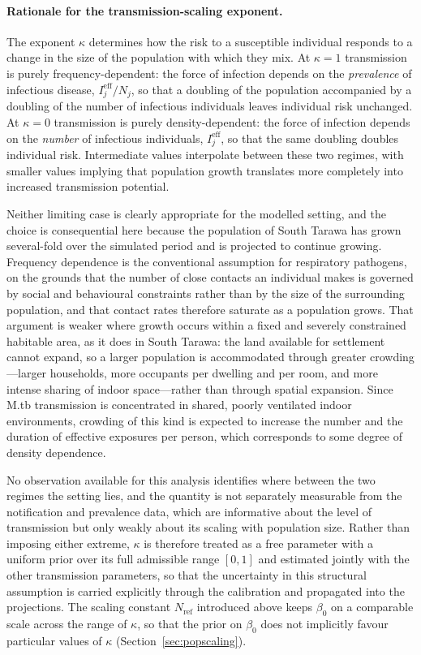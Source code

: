\documentclass[11pt]{article}
\begin{document}
\paragraph{Rationale for the transmission-scaling exponent.}
The exponent \(\kappa\) determines how the risk to a susceptible individual responds to a change in the size of the population with which they mix. At \(\kappa=1\) transmission is purely frequency-dependent: the force of infection depends on the \emph{prevalence} of infectious disease, \(I^{\mathrm{eff}}_j/N_j\), so that a doubling of the population accompanied by a doubling of the number of infectious individuals leaves individual risk unchanged. At \(\kappa=0\) transmission is purely density-dependent: the force of infection depends on the \emph{number} of infectious individuals, \(I^{\mathrm{eff}}_j\), so that the same doubling doubles individual risk. Intermediate values interpolate between these two regimes, with smaller values implying that population growth translates more completely into increased transmission potential.

Neither limiting case is clearly appropriate for the modelled setting, and the choice is consequential here because the population of South Tarawa has grown several-fold over the simulated period and is projected to continue growing. Frequency dependence is the conventional assumption for respiratory pathogens, on the grounds that the number of close contacts an individual makes is governed by social and behavioural constraints rather than by the size of the surrounding population, and that contact rates therefore saturate as a population grows. That argument is weaker where growth occurs within a fixed and severely constrained habitable area, as it does in South Tarawa: the land available for settlement cannot expand, so a larger population is accommodated through greater crowding---larger households, more occupants per dwelling and per room, and more intense sharing of indoor space---rather than through spatial expansion. Since M.tb transmission is concentrated in shared, poorly ventilated indoor environments, crowding of this kind is expected to increase the number and the duration of effective exposures per person, which corresponds to some degree of density dependence.

No observation available for this analysis identifies where between the two regimes the setting lies, and the quantity is not separately measurable from the notification and prevalence data, which are informative about the level of transmission but only weakly about its scaling with population size. Rather than imposing either extreme, \(\kappa\) is therefore treated as a free parameter with a uniform prior over its full admissible range \([0,1]\) and estimated jointly with the other transmission parameters, so that the uncertainty in this structural assumption is carried explicitly through the calibration and propagated into the projections. The scaling constant \(N_{\mathrm{ref}}\) introduced above keeps \(\beta_0\) on a comparable scale across the range of \(\kappa\), so that the prior on \(\beta_0\) does not implicitly favour particular values of \(\kappa\) (Section~\ref{sec:popscaling}).
\end{document}
